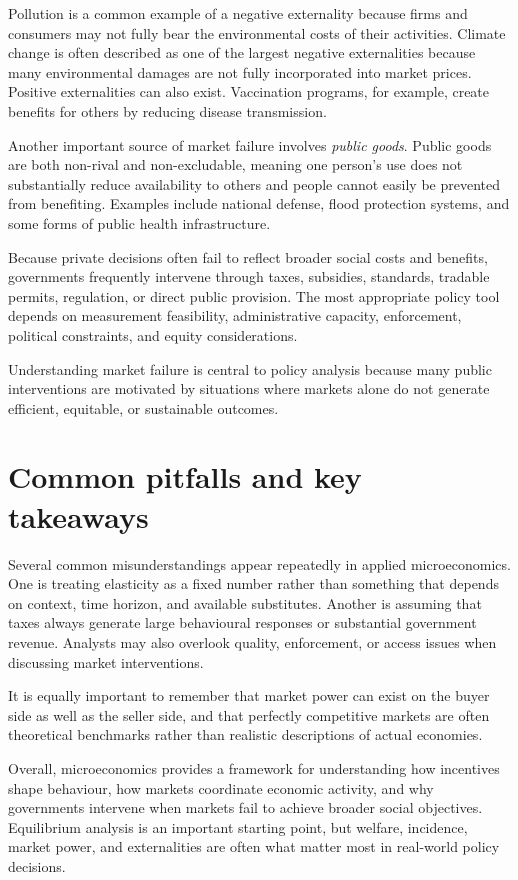 \documentclass[
  11pt,
  oneside]{book}
\begin{document}
Pollution is a common example of a negative externality because firms and consumers may not fully bear the environmental costs of their activities. Climate change is often described as one of the largest negative externalities because many environmental damages are not fully incorporated into market prices. Positive externalities can also exist. Vaccination programs, for example, create benefits for others by reducing disease transmission.

Another important source of market failure involves \emph{public goods}. Public goods are both non-rival and non-excludable, meaning one person's use does not substantially reduce availability to others and people cannot easily be prevented from benefiting. Examples include national defense, flood protection systems, and some forms of public health infrastructure.

Because private decisions often fail to reflect broader social costs and benefits, governments frequently intervene through taxes, subsidies, standards, tradable permits, regulation, or direct public provision. The most appropriate policy tool depends on measurement feasibility, administrative capacity, enforcement, political constraints, and equity considerations.

Understanding market failure is central to policy analysis because many public interventions are motivated by situations where markets alone do not generate efficient, equitable, or sustainable outcomes.

\section{Common pitfalls and key takeaways}\label{common-pitfalls-and-key-takeaways}

Several common misunderstandings appear repeatedly in applied microeconomics. One is treating elasticity as a fixed number rather than something that depends on context, time horizon, and available substitutes. Another is assuming that taxes always generate large behavioural responses or substantial government revenue. Analysts may also overlook quality, enforcement, or access issues when discussing market interventions.

It is equally important to remember that market power can exist on the buyer side as well as the seller side, and that perfectly competitive markets are often theoretical benchmarks rather than realistic descriptions of actual economies.

Overall, microeconomics provides a framework for understanding how incentives shape behaviour, how markets coordinate economic activity, and why governments intervene when markets fail to achieve broader social objectives. Equilibrium analysis is an important starting point, but welfare, incidence, market power, and externalities are often what matter most in real-world policy decisions.
\end{document}
